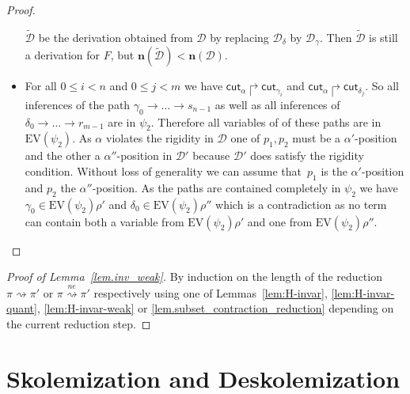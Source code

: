 \documentclass{LMCS}
\theoremstyle{plain}
\theoremstyle{definition}
\def\cutr{\mathsf{cut}}
\newcommand{\DD}{\mathcal{D}}
\newcommand{\DDt}{\tilde{\mathcal{D}}}
\newcommand{\nonrigd}[1]{\mathbf{n}(#1)}
\newcommand{\EV}{\mathrm{EV}}	\newcommand{\EVc}{\mathrm{EV_c}}	\newcommand{\Hseq}{\mathrm{H}}	\newcommand{\Bsub}{\mathrm{B}}	\newcommand{\terms}[1]{\mathrm{tm}(#1)}	\newcommand{\ev}[1]{\mathrm{ev}(#1)}	\newcommand{\cred}{\rightsquigarrow}	\newcommand{\credm}{\stackrel{\mathit{ne}}{\rightsquigarrow}}	\newcommand{\genrel}{\longrightarrow}
\newcommand{\cutrr}[1]{\cutr_{#1}}
\newcommand{\rightabove}[2]{#2\mathbin{\Rsh}#1}
\begin{document}
\begin{proof}
\begin{itemize}
  $\DDt$ be the derivation obtained from $\DD$ by replacing
  $\DD_\delta$ by $\DD_\gamma$. Then $\DDt$ is still a derivation for
  $F$, but $\nonrigd{\DDt}<\nonrigd{\DD}$.
\item For all $0\le i<n$ and $0\le j<m$ we have
  $\rightabove{\cutrr{\gamma_i}}{\cutrr{\alpha}}$ and
  $\rightabove{\cutrr{\delta_j}}{\cutrr{\alpha}}$. So all inferences
  of the path $\gamma_0\to \ldots \to s_{n-1}$ as well as all
  inferences of $\delta_0\to\ldots\to r_{m-1}$ are in
  $\psi_2$. Therefore all variables of of these paths are in
  $\EV(\psi_2)$. As $\alpha$ violates the rigidity in $\DD$ one of
  $p_1,p_2$ must be a $\alpha'$-position and the other a
  $\alpha''$-position in $\DD'$ because $\DD'$ does satisfy the
  rigidity condition. Without loss of generality we can assume
  that~$p_1$ is the $\alpha'$-position and $p_2$ the
  $\alpha''$-position. As the paths are contained completely in
  $\psi_2$ we have $\gamma_0\in\EV(\psi_2)\rho'$ and
  $\delta_0\in\EV(\psi_2)\rho''$ which is a contradiction as no term
  can contain both a variable from $\EV(\psi_2)\rho'$ and one from
  $\EV(\psi_2)\rho''$.  \qedhere
\end{itemize}
\end{proof}


\begin{proof}[Proof of Lemma~\ref{lem.inv_weak}]
By induction on the length of the reduction $\pi\cred\pi'$
or $\pi\credm\pi'$ respectively using one of Lemmas~\ref{lem:H-invar}, 
\ref{lem:H-invar-quant}, \ref{lem:H-invar-weak} or \ref{lem.subset_contraction_reduction}
depending on the current reduction step.
\end{proof}



\section{Skolemization and Deskolemization}\label{sec.skol_deskol}
\end{document}
